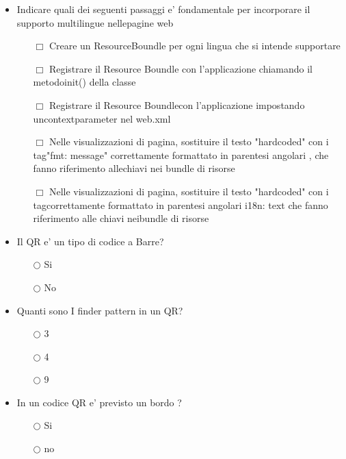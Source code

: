 \documentclass[10pt,twocolumn]{article}
\begin{document}
\begin{itemize}
    \item Indicare quali dei seguenti passaggi e' fondamentale per incorporare il supporto multilingue nellepagine web
          \begin{itemize}
              \item[$\Box$] Creare un ResourceBoundle per ogni lingua che si intende supportare
              \item[$\Box$] Registrare il Resource Boundle con l'applicazione chiamando il metodoinit() della classe
              \item[$\Box$] Registrare il Resource Boundlecon l'applicazione impostando uncontextparameter nel web.xml
              \item[$\Box$] Nelle visualizzazioni di pagina, sostituire il testo "hardcoded" con i tag"fmt: message" correttamente formattato in parentesi angolari , che fanno riferimento allechiavi nei bundle di risorse
              \item[$\Box$] Nelle visualizzazioni di pagina, sostituire il testo "hardcoded" con i tagcorrettamente formattato in parentesi angolari i18n: text che fanno riferimento alle chiavi neibundle di risorse
          \end{itemize}
\end{itemize}
\begin{itemize}
    \item Il QR e' un tipo di codice a Barre?
          \begin{itemize}
              \item[$\bigcirc$] Si
              \item[$\bigcirc$] No
          \end{itemize}
\end{itemize}
\begin{itemize}
    \item Quanti sono I finder pattern in un QR?
          \begin{itemize}
              \item[$\bigcirc$] 3
              \item[$\bigcirc$] 4
              \item[$\bigcirc$] 9
          \end{itemize}
\end{itemize}
\begin{itemize}
    \item In un codice QR e' previsto un bordo ?
          \begin{itemize}
              \item[$\bigcirc$] Si
              \item[$\bigcirc$] no
          \end{itemize}
\end{itemize}
\end{document}
